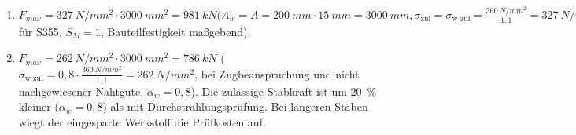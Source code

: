 \documentclass[11pt,a4paper]{scrartcl}
\begin{document}
\begin{solution}[print]
	\begin{enumerate}
		\item $F_{max}= \SI{327}{N\per mm^2}\cdot\SI{3000}{mm^2}= \SI{981}{kN} (A_w = A =\SI{200}{mm}\cdot \SI{15}{mm} = \SI{3000}{mm},\sigma_{\text{zul}} = \sigma_{\text{w zul}}= \frac{\SI{360}{N\per mm^2}}{1,1}= \SI{327}{N\per mm^2}, R_e=\SI{360}{N\per mm^2}$ für S355, $S_M = 1$, Bauteilfestigkeit
		maßgebend).
		\item $F_{max}= \SI{262}{N\per mm^2}\cdot\SI{3000}{mm^2}= \SI{786}{kN}$ ($\sigma_{\text{w zul}} = 0,8\cdot\frac{\SI{360}{N\per mm^2}}{1,1}= \SI{262}{N\per mm^2}$, bei Zugbeanspruchung und nicht nachgewiesener Nahtgüte, $\alpha_w = 0,8$). Die zulässige Stabkraft ist um \SI{20}{\percent} kleiner ($\alpha_w = 0,8$) als mit Durchstrahlungsprüfung. Bei längeren Stäben wiegt der eingesparte Werkstoff die Prüfkosten auf.
	\end{enumerate}
\end{solution}
\end{document}
